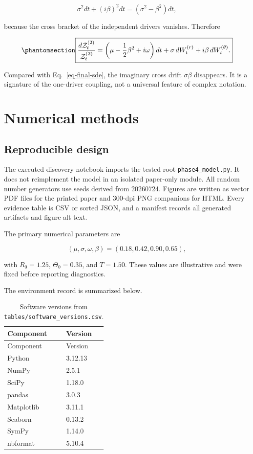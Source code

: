 \documentclass[
  english,
  10pt,
  letterpaper,
  DIV=11,
  numbers=noendperiod]{scrartcl}
\begin{document}
\[
\sigma^2dt+(i\beta)^2dt=(\sigma^2-\beta^2)dt,
\]

because the cross bracket of the independent drivers vanishes. Therefore

\begin{equation}\protect\phantomsection\label{eq-two-driver-sde}{
\boxed{
\frac{d\mathcal Z_t^{(2)}}{\mathcal Z_t^{(2)}}
=
\left(\mu-\frac12\beta^2+i\omega\right)dt
+\sigma\,dW_t^{(r)}
+i\beta\,dW_t^{(\theta)}.
}
}\end{equation}

Compared with Eq.~\ref{eq-final-sde}, the imaginary cross drift
\(\sigma\beta\) disappears. It is a signature of the one-driver
coupling, not a universal feature of complex notation.

\section{Numerical methods}\label{sec-methods}

\subsection{Reproducible design}\label{reproducible-design}

The executed discovery notebook imports the tested root
\texttt{phase4\_model.py}. It does not reimplement the model in an
isolated paper-only module. All random number generators use seeds
derived from 20260724. Figures are written as vector PDF files for the
printed paper and 300-dpi PNG companions for HTML. Every evidence table
is CSV or sorted JSON, and a manifest records all generated artifacts
and figure alt text.

The primary numerical parameters are

\[
(\mu,\sigma,\omega,\beta)=(0.18,0.42,0.90,0.65),
\]

with \(R_0=1.25\), \(\Theta_0=0.35\), and \(T=1.50\). These values are
illustrative and were fixed before reporting diagnostics.

The environment record is summarized below.

\begin{longtable}[]{@{}ll@{}}
\caption{Software versions from
\protect\texttt{tables/software\_versions.csv}.}\label{tbl-software}\tabularnewline
\toprule\noalign{}
Component & Version \\
\midrule\noalign{}
\endfirsthead
\toprule\noalign{}
Component & Version \\
\midrule\noalign{}
\endhead
\bottomrule\noalign{}
\endlastfoot
Python & 3.12.13 \\
NumPy & 2.5.1 \\
SciPy & 1.18.0 \\
pandas & 3.0.3 \\
Matplotlib & 3.11.1 \\
Seaborn & 0.13.2 \\
SymPy & 1.14.0 \\
nbformat & 5.10.4 \\
\end{longtable}
\end{document}
